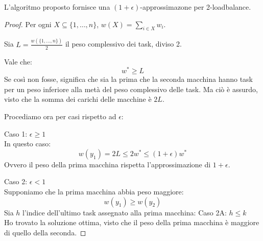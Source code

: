 \begin{theorem}
    L'algoritmo proposto fornisce una $(1+\epsilon)$-approssimazone per 
    2-loadbalance.
\end{theorem}
\begin{proof}    
    Per ogni $X \subseteq \{1, \dots, n\}$, $w(X) = \sum_{i\in X}w_i$.

    Sia $L = \frac{w(\{1, \dots, n\})}{2}$ il peso complessivo dei task, diviso 2.

    Vale che: 
    $$w^* \geq L $$
    Se così non fosse, significa che sia la prima che la seconda macchina hanno
    task per un peso inferiore alla metà del peso complessivo delle task.
    Ma ciò è assurdo, visto che la somma dei carichi delle macchine è $2L$.

    Procediamo ora per casi rispetto ad $\epsilon$:

    Caso 1: $\epsilon \geq 1$\\
    In questo caso:
    $$w(y_1) = 2L \leq 2w^* \leq (1+\epsilon)w^*$$
    Ovvero il peso della prima macchina rispetta l'approssimazione di $1+\epsilon$.

    Caso 2: $\epsilon < 1$\\
    Supponiamo che la prima macchina abbia peso maggiore: 
    $$w(y_1) \geq w(y_2)$$
    Sia $h$ l'indice dell'ultimo task assegnato alla prima macchina:
    Caso 2A: $h \leq k$ \\
    Ho trovato la soluzione ottima, visto che il peso della 
    prima macchina è maggiore di quello della seconda.
    

\end{proof}
